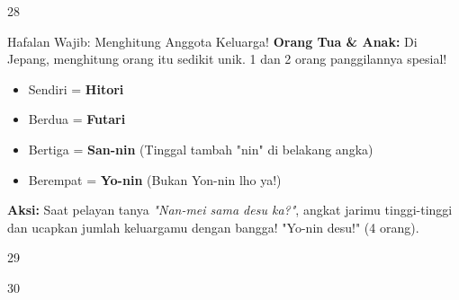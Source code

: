 \begin{convobox}{28}
    \noindent
      
      
      
      

    \vspace{1.5em}
\end{convobox}

\begin{lessonbox}{Hafalan Wajib: Menghitung Anggota Keluarga!}
    \textbf{Orang Tua \& Anak:} Di Jepang, menghitung orang itu sedikit unik. 1 dan 2 orang panggilannya spesial!
    \begin{itemize}
        \item Sendiri = \textbf{Hitori}
        \item Berdua = \textbf{Futari}
        \item Bertiga = \textbf{San-nin} (Tinggal tambah "nin" di belakang angka)
        \item Berempat = \textbf{Yo-nin} (Bukan Yon-nin lho ya!)
    \end{itemize}
    \textbf{Aksi:} Saat pelayan tanya \textit{"Nan-mei sama desu ka?"}, angkat jarimu tinggi-tinggi dan ucapkan jumlah keluargamu dengan bangga! "Yo-nin desu!" (4 orang).
\end{lessonbox}

\begin{convobox}{29}
    \noindent

    \vspace{1.5em}
\end{convobox}

\begin{convobox}{30}
    \noindent
      

    \vspace{1.5em}
\end{convobox}

